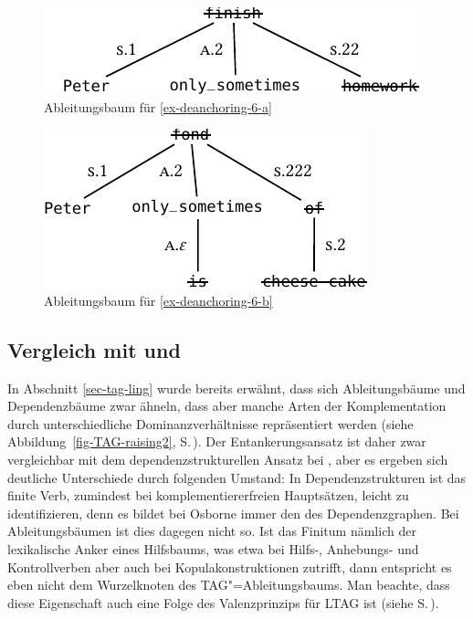 \begin{figure}[t]
\centering
\includegraphics{graphics/abb819.pdf}
\caption{\label{fig-deanchoring-6}Ableitungsbaum für \ref{ex-deanchoring-6-a} \citep[Figure~8]{Lichte:Kallmeyer:10}}
\end{figure}

\begin{figure}[t]
\centering
\includegraphics{graphics/abb820.pdf}
\caption{\label{fig-deanchoring-7}Ableitungsbaum für \ref{ex-deanchoring-6-b} \citep[Figure~9]{Lichte:Kallmeyer:10}}
\end{figure}

\subsection{Vergleich mit \cite{Osborne:08} und \cite{Kobele:09}}

In Abschnitt \ref{sec-tag-ling} wurde bereits erwähnt, dass sich Ableitungsbäume und Dependenzbäume zwar ähneln, dass aber manche Arten der Komplementation durch unterschiedliche Dominanzverhältnisse repräsentiert werden (siehe Abbildung~\ref{fig-TAG-raising2}, S.\,\pageref{fig-TAG-raising2}). Der Ent\-ankerungs\-ansatz ist daher zwar vergleichbar mit dem dependenzstrukturellen Ansatz bei \cite{Osborne:08}, aber es ergeben sich deutliche Unterschiede durch folgenden Umstand: In Dependenzstrukturen ist das finite Verb, zumindest bei komplementiererfreien Hauptsätzen, leicht zu identifizieren, denn es bildet bei Osborne immer den  des Dependenzgraphen. Bei Ableitungsbäumen ist dies dagegen nicht so. Ist das Finitum nämlich der lexikalische Anker eines Hilfsbaums, was etwa bei Hilfs-, Anhebungs- und Kontrollverben aber auch bei Kopulakonstruktionen zutrifft, dann entspricht es eben nicht dem Wurzelknoten des TAG"=Ableitungsbaums. Man beachte, dass diese Eigenschaft auch eine Folge des Valenzprinzips für LTAG ist (siehe S.\,\pageref{ex-valenzprinzip-tag}).  

